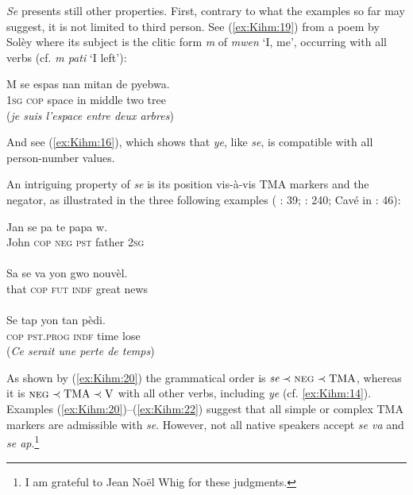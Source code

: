 \documentclass[output=paper]{langsci/langscibook}
\begin{document}
\emph{Se} presents still other properties. First, contrary to what the
examples so far may suggest, it is not limited to third
person. See (\ref{ex:Kihm:19}) from a poem by Solèy %
\citep[22]{ChalmersKenolEtAl2015} %
%
where
its subject is the clitic form \emph{m} of \emph{mwen} `I, me',
occurring with all verbs (cf. \emph{m pati} `I left'):

\ea\label{ex:Kihm:19} \gll M se espas nan mitan de pyebwa.\\
\textsc{1sg} \textsc{cop} space in middle two tree \\
\glt {} (\emph{je suis l'espace entre deux arbres}) \\
\z

And see (\ref{ex:Kihm:16}), which shows that \emph{ye}, like \emph{se}, is compatible with
all person-number values.

An intriguing property of \emph{se} is its position vis-à-vis TMA
markers and the negator, as illustrated in the three following examples
%
(%
\citealt{Glaude2012}%
%
: 39; %
\citealt{Valdman78}%
%
: 240; Cavé in %
\citealt{ChalmersKenolEtAl2015}%
%
: 46):
%


\ea\label{ex:Kihm:20} \gll Jan se pa te papa w.\\
John \textsc{cop} \textsc{neg} \textsc{pst} father \textsc{2sg} \\
\glt {} \\

\ex\label{ex:Kihm:21} \gll Sa se va yon gwo nouvèl.\\
that \textsc{cop} \textsc{fut} \textsc{indf} great news \\
\glt {} \\

\ex\label{ex:Kihm:22} \gll Se tap yon tan pèdi.\\
\textsc{cop} \textsc{pst.prog} \textsc{indf} time lose \\
\glt {} (\emph{Ce serait une perte de temps}) \\
\z

As shown by (\ref{ex:Kihm:20}) the grammatical order is $\textit{se} \prec \textsc{neg} \prec
\text{TMA}$, whereas it is $\textsc{neg} \prec \text{TMA}\prec\text{V}$ with all other verbs,
including \emph{ye} (cf. \ref{ex:Kihm:14}). Examples (\ref{ex:Kihm:20})--(\ref{ex:Kihm:22}) suggest that all
simple or complex TMA markers are admissible with \emph{se}. However,
not all native speakers accept \emph{se va} and \emph{se ap}.\footnote{I
  am grateful to Jean Noël Whig for these judgments.}
\end{document}
